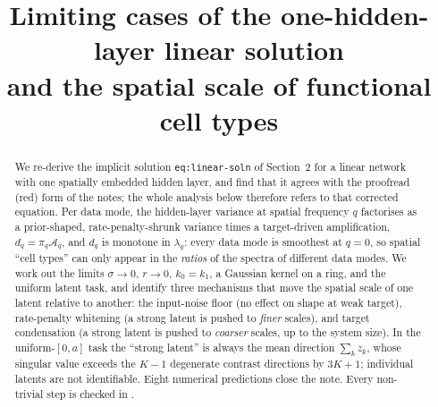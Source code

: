\documentclass[11pt,a4paper]{article}
\title{Limiting cases of the one-hidden-layer linear solution\\and the spatial scale of functional cell types}
\author{}
\date{}
\newcommand{\amp}{\mathcal A}
\theoremstyle{remark}
\begin{document}
\maketitle

\begin{abstract}
We re-derive the implicit solution \texttt{eq:linear-soln} of Section~2 for a linear network with one spatially embedded hidden layer, and find that it agrees with the proofread (red) form of the notes; the whole analysis below therefore refers to that corrected equation. Per data mode, the hidden-layer variance at spatial frequency $q$ factorises as a prior-shaped, rate-penalty-shrunk variance times a target-driven amplification, $d_q = \pi_q \amp_q$, and $d_q$ is monotone in $\lambda_q$: every data mode is smoothest at $q = 0$, so spatial ``cell types'' can only appear in the \emph{ratios} of the spectra of different data modes. We work out the limits $\sigma \to 0$, $r \to 0$, $k_0 = k_1$, a Gaussian kernel on a ring, and the uniform latent task, and identify three mechanisms that move the spatial scale of one latent relative to another: the input-noise floor (no effect on shape at weak target), rate-penalty whitening (a strong latent is pushed to \emph{finer} scales), and target condensation (a strong latent is pushed to \emph{coarser} scales, up to the system size). In the uniform-$[0,a]$ task the ``strong latent'' is always the mean direction $\sum_k z_k$, whose singular value exceeds the $K-1$ degenerate contrast directions by $3K+1$; individual latents are not identifiable. Eight numerical predictions close the note. Every non-trivial step is checked in .
\end{abstract}
\end{document}
